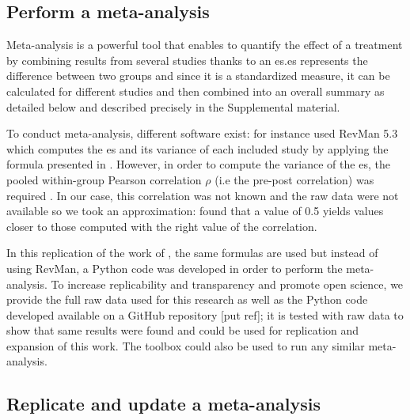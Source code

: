 \subsection{Perform a meta-analysis}

Meta-analysis is a powerful tool that enables to quantify the effect of a treatment by combining results from several studies thanks to 
an \gls{es}.\gls{es} represents the difference between two groups and since it is a standardized measure, it can be calculated for different 
studies and then combined into an overall summary as detailed below and described precisely in the Supplemental material.

To conduct meta-analysis, different software exist: for instance \citet{Cortese2016} used RevMan 5.3 \citep{RevMan} which computes the \gls{es} and its 
variance of each included study by applying the formula presented in \citet{Morris2008}. However, in order to compute the variance of the \gls{es}, 
the pooled within-group Pearson correlation $\rho$ (i.e the pre-post correlation) was required 
\citep{James2013}. In our case, this correlation was not known and the raw data were not available so we took an
 approximation: \citet{Balk2012} found that a value of 0.5 yields values closer to those computed with the right value of the correlation. 

In this replication of the work of \citeauthor{Cortese2016}, the same
formulas are used \citep{Borenstein2009} but instead of using RevMan, a Python code was developed in order to perform the meta-analysis. To increase 
replicability and transparency and promote open science, we provide the full raw data used for this research as well as the Python code 
developed available on a GitHub repository [put ref]; it is tested with \citet{Cortese2016} raw data to show that same results were found and could 
be used for replication and expansion of this work. The toolbox could also be used to run any similar meta-analysis.  
 
\subsection{Replicate and update a meta-analysis}

